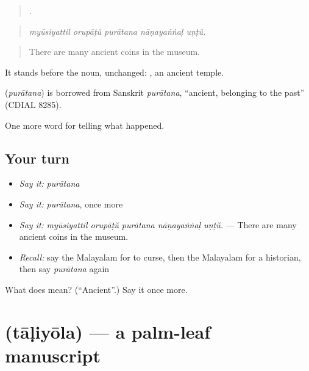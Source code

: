 \begin{quote}
    .
\end{quote}

\begin{quote}
\emph{myūsiyattil orupāṭŭ purātana nāṇayaṅṅaḷ uṇṭŭ.}
\end{quote}

\begin{quote}
There are many ancient coins in the museum.
\end{quote}

It stands before the noun, unchanged:  , an ancient temple.

\begin{cousinweb}
\textbf{} (\emph{purātana}) is borrowed from Sanskrit \emph{purātana}, \textquotedblleft{}ancient, belonging to the past\textquotedblright{} (CDIAL 8285).
\end{cousinweb}

\begin{grammarlens}[title={What you've built}]
One more word for telling what happened.
\end{grammarlens}

\subsection*{Your turn}
\begin{itemize}
\raggedright
  \item \emph{Say it:} \emph{purātana}
  \item \emph{Say it:} \emph{purātana}, once more
  \item \emph{Say it:} \emph{myūsiyattil orupāṭŭ purātana nāṇayaṅṅaḷ uṇṭŭ.} — There are many ancient coins in the museum.
  \item \emph{Recall:} say the Malayalam for to curse, then the Malayalam for a historian, then say \emph{purātana} again
\end{itemize}

\begin{tcolorbox}[breakable,colback=teal!4,colframe=teal!35!black,title={Before you move on}]
What does  mean? (\textquotedblleft{}Ancient\textquotedblright{}.) Say it once more.
\end{tcolorbox}
\section[\texorpdfstring{\ml{താളിയോല} (tāḷiyōla)}{താളിയോല (tāḷiyōla)}]{ (tāḷiyōla) — a palm-leaf manuscript}

